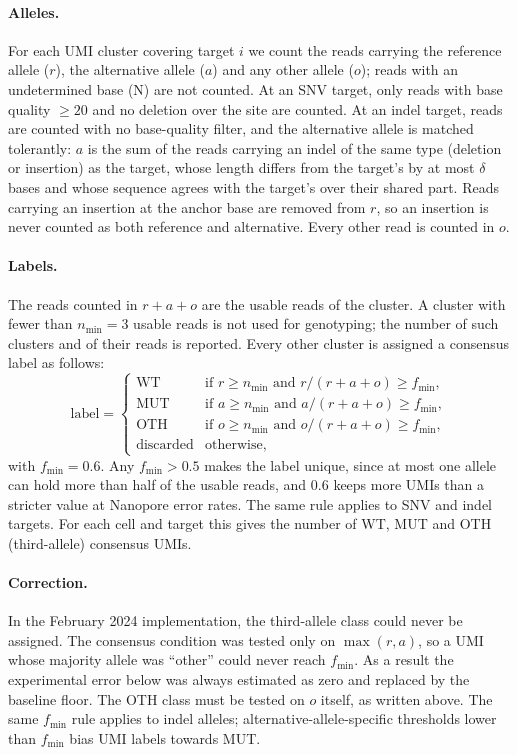 \documentclass[11pt]{article}
\begin{document}
\paragraph{Alleles.} For each UMI cluster covering target $i$ we count the reads carrying the reference allele ($r$), the alternative allele ($a$) and any other allele ($o$); reads with an undetermined base (N) are not counted. At an SNV target, only reads with base quality $\geq 20$ and no deletion over the site are counted. At an indel target, reads are counted with no base-quality filter, and the alternative allele is matched tolerantly: $a$ is the sum of the reads carrying an indel of the same type (deletion or insertion) as the target, whose length differs from the target's by at most $\delta$ bases and whose sequence agrees with the target's over their shared part. Reads carrying an insertion at the anchor base are removed from $r$, so an insertion is never counted as both reference and alternative. Every other read is counted in $o$.

\paragraph{Labels.} The reads counted in $r+a+o$ are the usable reads of the cluster. A cluster with fewer than $n_{\min}=3$ usable reads is not used for genotyping; the number of such clusters and of their reads is reported. Every other cluster is assigned a consensus label as follows:
\begin{equation}
\text{label} =
\begin{cases}
\text{WT}  & \text{if } r \geq n_{\min} \text{ and } r/(r+a+o) \geq f_{\min},\\
\text{MUT} & \text{if } a \geq n_{\min} \text{ and } a/(r+a+o) \geq f_{\min},\\
\text{OTH} & \text{if } o \geq n_{\min} \text{ and } o/(r+a+o) \geq f_{\min},\\
\text{discarded} & \text{otherwise,}
\end{cases}
\end{equation}
with $f_{\min}=0.6$. Any $f_{\min} > 0.5$ makes the label unique, since at most one allele can hold more than half of the usable reads, and $0.6$ keeps more UMIs than a stricter value at Nanopore error rates. The same rule applies to SNV and indel targets. For each cell and target this gives the number of WT, MUT and OTH (third-allele) consensus UMIs.

\paragraph{Correction.} In the February 2024 implementation, the third-allele class could never be assigned. The consensus condition was tested only on $\max(r,a)$, so a UMI whose majority allele was ``other'' could never reach $f_{\min}$. As a result the experimental error below was always estimated as zero and replaced by the baseline floor. The OTH class must be tested on $o$ itself, as written above. The same $f_{\min}$ rule applies to indel alleles; alternative-allele-specific thresholds lower than $f_{\min}$ bias UMI labels towards MUT.
\end{document}

